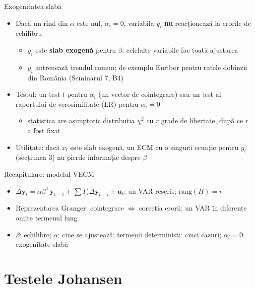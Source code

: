 \begin{frame}{Exogenitatea slabă}
\itemsize{\small}
\begin{itemize}
    \item Dacă un rînd din $\alpha$ este nul, $\alpha_i = 0$, variabila $y_i$ \textbf{nu} reacționează la erorile de echilibru
    \begin{itemize}
        \item $y_i$ este \textbf{slab exogenă} pentru $\beta$: celelalte variabile fac toată ajustarea
        \item $y_i$ antrenează trendul comun; de exemplu Euribor pentru ratele dobînzii din România (Seminarul 7, B4)
    \end{itemize}
    \item Testul: un test $t$ pentru $\alpha_i$ (un vector de cointegrare) sau un test al raportului de verosimilitate (LR) pentru $\alpha_i = 0$ 
    \begin{itemize}
        \item statistica are asimptotic distribuția $\chi^2$ cu $r$ grade de libertate, după ce $r$ a fost fixat
    \end{itemize}
    \item Utilitate: dacă $x_t$ este slab exogenă, un ECM cu o singură ecuație pentru $y_t$ (secțiunea 3) nu pierde informație despre $\beta$
\end{itemize}
\end{frame}

\begin{frame}{Recapitulare: modelul VECM}
\itemsize{\small}
\begin{itemize}
    \item $\Delta\mathbf y_t = \alpha\beta^\top\mathbf y_{t-1} + \sum\Gamma_i\Delta\mathbf y_{t-i} + \mathbf u_t$: un VAR rescris; $\mathrm{rang}(\Pi) = r$
    \item Reprezentarea Granger: cointegrare $\Leftrightarrow$ corecția erorii; un VAR în diferențe omite termenul lung
    \item $\beta$: echilibre; $\alpha$: cine se ajustează; termenii determiniști: cinci cazuri; $\alpha_i = 0$: exogenitate slabă
\end{itemize}
\end{frame}


\section{Testele Johansen}

